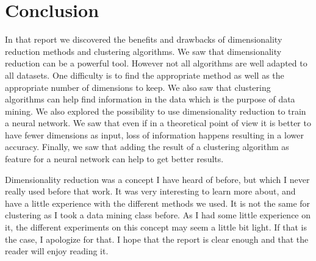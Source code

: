 \documentclass[twocolumn, 10pt]{article}
\begin{document}
	\section{Conclusion}
		In that report we discovered the benefits and drawbacks of dimensionality reduction methods and clustering algorithms. We saw that dimensionality reduction can be a powerful tool. However not all algorithms are well adapted to all datasets. One difficulty is to find the appropriate method as well as the appropriate number of dimensions to keep. We also saw that clustering algorithms can help find information in the data which is the purpose of data mining. We also explored the possibility to use dimensionality reduction to train a neural network. We saw that even if in a theoretical point of view it is better to have fewer dimensions as input, loss of information happens resulting in a lower accuracy. Finally, we saw that adding the result of a clustering algorithm as feature for a neural network can help to get better results.

		Dimensionality reduction was a concept I have heard of before, but which I never really used before that work. It was very interesting to learn more about, and have a little experience with the different methods we used. It is not the same for clustering as I took a data mining class before. As I had some little experience on it, the different experiments on this concept may seem a little bit light. If that is the case, I apologize for that. I hope that the report is clear enough and that the reader will enjoy reading it.
\end{document}
